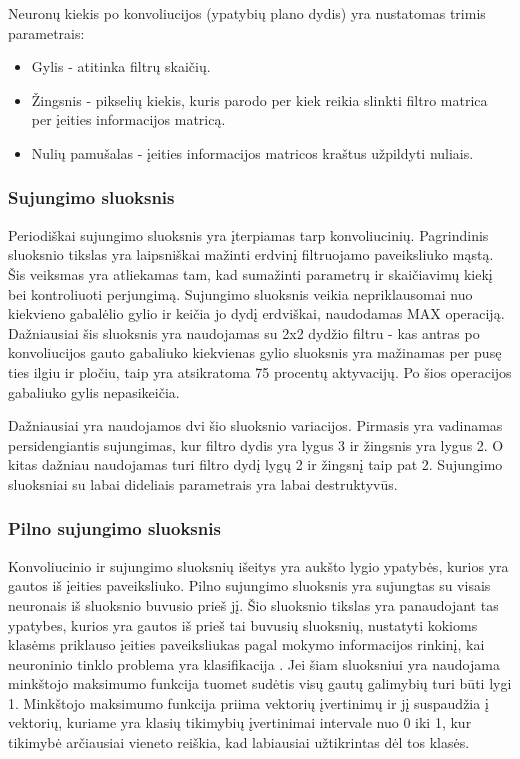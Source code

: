 \documentclass{VUMIFPSkursinis}
\begin{document}
Neuronų kiekis po konvoliucijos (ypatybių plano dydis) yra nustatomas trimis parametrais:
\begin{itemize}
\item Gylis - atitinka filtrų skaičių.
\item Žingsnis - pikselių kiekis, kuris parodo per kiek reikia slinkti filtro matrica per įeities informacijos matricą.
\item Nulių pamušalas - įeities informacijos matricos kraštus užpildyti nuliais.
\end{itemize}


\subsubsection{Sujungimo sluoksnis}
Periodiškai sujungimo sluoksnis yra įterpiamas tarp konvoliucinių. Pagrindinis sluoksnio tikslas yra laipsniškai mažinti erdvinį filtruojamo paveiksliuko mąstą.
Šis veiksmas yra atliekamas tam, kad sumažinti parametrų ir skaičiavimų kiekį bei kontroliuoti perjungimą. Sujungimo sluoksnis veikia nepriklausomai nuo kiekvieno
gabalėlio gylio ir keičia jo dydį erdviškai, naudodamas MAX operaciją. Dažniausiai šis sluoksnis yra naudojamas su 2x2 dydžio filtru - kas antras po konvoliucijos 
gauto gabaliuko kiekvienas gylio sluoksnis yra mažinamas per pusę ties ilgiu ir pločiu, taip yra atsikratoma 75 procentų aktyvacijų. Po šios operacijos gabaliuko 
gylis nepasikeičia.

Dažniausiai yra naudojamos dvi šio sluoksnio variacijos. Pirmasis yra vadinamas persidengiantis sujungimas, kur filtro dydis yra lygus 3 ir žingsnis yra lygus 2. 
O kitas dažniau naudojamas turi filtro dydį lygų 2 ir žingsnį taip pat 2. Sujungimo sluoksniai su labai dideliais parametrais yra labai destruktyvūs.

\subsubsection{Pilno sujungimo sluoksnis}
Konvoliucinio ir sujungimo sluoksnių išeitys yra aukšto lygio ypatybės, kurios yra gautos iš įeities paveiksliuko. Pilno sujungimo sluoksnis yra sujungtas su visais 
neuronais iš sluoksnio buvusio prieš jį. Šio sluoksnio tikslas yra panaudojant tas ypatybes, kurios yra gautos iš prieš tai buvusių sluoksnių, nustatyti kokioms 
klasėms priklauso įeities paveiksliukas pagal mokymo informacijos rinkinį, kai neuroninio tinklo problema yra klasifikacija \cite{layers-fullyconnected}. Jei šiam sluoksniui yra naudojama 
minkštojo maksimumo funkcija tuomet sudėtis visų gautų galimybių turi būti lygi 1. Minkštojo maksimumo funkcija priima vektorių įvertinimų ir jį suspaudžia į 
vektorių, kuriame yra klasių tikimybių įvertinimai intervale nuo 0 iki 1, kur tikimybė arčiausiai vieneto reiškia, kad labiausiai užtikrintas dėl tos klasės.
\end{document}
